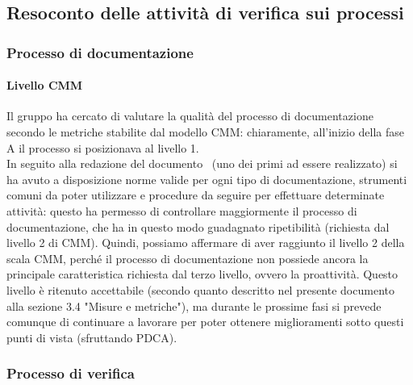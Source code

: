 \documentclass[../PianoDiQualifica.tex]{subfiles}
\begin{document}
\begin{appendices}
	\subsection{Resoconto delle attività di verifica sui processi}
		\subsubsection{Processo di documentazione}
			\paragraph{Livello CMM}
			Il gruppo ha cercato di valutare la qualità del processo di documentazione secondo le metriche stabilite dal modello CMM: chiaramente, all'inizio della fase A il processo si posizionava al livello 1.\\
			In seguito alla redazione del documento \normediprogetto\ (uno dei primi ad essere realizzato) si ha avuto a disposizione norme valide per ogni tipo di documentazione, strumenti comuni da poter utilizzare e procedure da seguire per effettuare determinate attività: questo ha permesso di controllare maggiormente il processo di documentazione, che ha in questo modo guadagnato ripetibilità (richiesta dal livello 2 di CMM).
			Quindi, possiamo affermare di aver raggiunto il livello 2 della scala CMM, perché il processo di documentazione non possiede ancora la principale caratteristica richiesta dal terzo livello, ovvero la proattività.
			Questo livello è ritenuto accettabile (secondo quanto descritto nel presente documento alla sezione 3.4 "Misure e metriche"), ma durante le prossime fasi si prevede comunque di continuare a lavorare per poter ottenere miglioramenti sotto questi punti di vista (sfruttando PDCA).
		\subsubsection{Processo di verifica}

\end{appendices}
\end{document}
